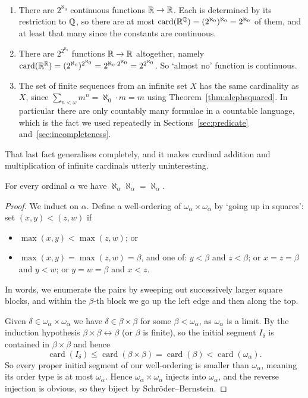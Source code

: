 \documentclass[a4paper]{scrartcl}
\newcommand{\card}{\operatorname{card}}
\begin{document}
\begin{example}~
  \begin{enumerate}[label=(\roman*)]
    \item There are $2^{\aleph_0}$ continuous functions $\mathbb{R} \to \mathbb{R}$. Each is determined by its restriction to $\mathbb{Q}$, so there are at most $\card(\R^\Q) = (2^{\aleph_0})^{\aleph_0} = 2^{\aleph_0}$ of them, and at least that many since the constants are continuous.
    \item There are $2^{2^{\aleph_0}}$ functions $\mathbb{R} \to \mathbb{R}$ altogether, namely $\card(\R^\R) = (2^{\aleph_0})^{2^{\aleph_0}} = 2^{\aleph_0 \cdot 2^{\aleph_0}} = 2^{2^{\aleph_0}}$. So `almost no' function is continuous.
    \item The set of finite sequences from an infinite set $X$ has the same cardinality as $X$, since $\sum_{n < \omega} m^n = \aleph_0 \cdot m = m$ using Theorem~\ref{thm:alephsquared}. In particular there are only countably many formulae in a countable language, which is the fact we used repeatedly in Sections~\ref{sec:predicate} and~\ref{sec:incompleteness}.
  \end{enumerate}
\end{example}

That last fact generalises completely, and it makes cardinal addition and multiplication of infinite cardinals utterly uninteresting.

\begin{theorem}\label{thm:alephsquared}
  For every ordinal $\alpha$ we have $\aleph_\alpha \aleph_\alpha = \aleph_\alpha$.
\end{theorem}
\begin{proof}
  We induct on $\alpha$. Define a well-ordering of $\omega_\alpha \times \omega_\alpha$ by `going up in squares': set $(x, y) < (z, w)$ if
  \begin{itemize}
    \item $\max(x, y) < \max(z, w)$; or
    \item $\max(x,y) = \max(z,w) = \beta$, and one of: $y < \beta$ and $z < \beta$; or $x = z = \beta$ and $y < w$; or $y = w = \beta$ and $x < z$.
  \end{itemize}
  In words, we enumerate the pairs by sweeping out successively larger square blocks, and within the $\beta$-th block we go up the left edge and then along the top.

  Given $\delta \in \omega_\alpha \times \omega_\alpha$ we have $\delta \in \beta \times \beta$ for some $\beta < \omega_\alpha$, as $\omega_\alpha$ is a limit. By the induction hypothesis $\beta \times \beta \leftrightarrow \beta$ (or $\beta$ is finite), so the initial segment $I_\delta$ is contained in $\beta \times \beta$ and hence
  $$\card(I_\delta) \leq \card(\beta \times \beta) = \card(\beta) < \card(\omega_\alpha).$$
  So every proper initial segment of our well-ordering is smaller than $\omega_\alpha$, meaning its order type is at most $\omega_\alpha$. Hence $\omega_\alpha \times \omega_\alpha$ injects into $\omega_\alpha$, and the reverse injection is obvious, so they biject by Schr\"oder--Bernstein.
\end{proof}
\end{document}
